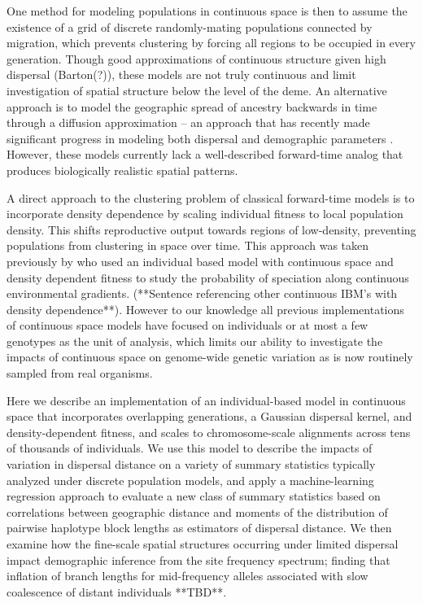 \documentclass[9pt,twocolumn,twoside,lineno]{gsajnl}
\begin{document}
One method for modeling populations in continuous space is then to assume the existence of a grid of discrete randomly-mating populations connected by migration, which prevents clustering by forcing all regions to be occupied in every generation. Though good approximations of continuous structure given high dispersal (Barton(?)), these models are not truly continuous and limit investigation of spatial structure below the level of the deme. An alternative approach is to model the geographic spread of ancestry backwards in time through a diffusion approximation -- an approach that has recently made significant progress in modeling both dispersal and demographic parameters \citep{Barton2010,Kelleher2014,Ringbauer2017,Ringbauer2018}. However, these models currently lack a well-described forward-time analog that produces biologically realistic spatial patterns. 

A direct approach to the clustering problem of classical forward-time models is to incorporate density dependence by scaling individual fitness to local population density. This shifts reproductive output towards regions of low-density, preventing populations from clustering in space over time. This approach was taken previously by \citep{Doebeli2003} who used an individual based model with continuous space and density dependent fitness to study the probability of speciation along continuous environmental gradients. (**Sentence referencing other continuous IBM's with density dependence**). However to our knowledge all previous implementations of continuous space models have focused on individuals or at most a few genotypes as the unit of analysis, which limits our ability to investigate the impacts of continuous space on genome-wide genetic variation as is now routinely sampled from real organisms. 

Here we describe an implementation of an individual-based model in continuous space that incorporates overlapping generations, a Gaussian dispersal kernel, and density-dependent fitness, and scales to chromosome-scale alignments across tens of thousands of individuals. We use this model to describe the impacts of variation in dispersal distance on a variety of summary statistics typically analyzed under discrete population models, and apply a machine-learning regression approach to evaluate a new class of summary statistics based on correlations between geographic distance and moments of the distribution of pairwise haplotype block lengths as estimators of dispersal distance. We then examine how the fine-scale spatial structures occurring under limited dispersal impact demographic inference from the site frequency spectrum; finding that inflation of branch lengths for mid-frequency alleles associated with slow coalescence of distant individuals **TBD**. 
\end{document}
